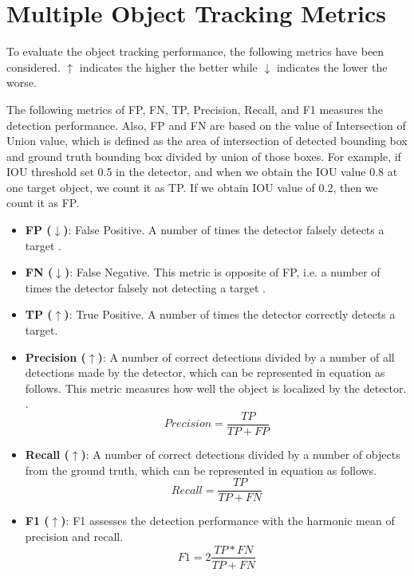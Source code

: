 \section{Multiple Object Tracking Metrics}
\label{sec:background/section_d}

To evaluate the object tracking performance, the following metrics have been considered. $\uparrow$ indicates the higher the better while $\downarrow$ indicates the lower the worse.

The following metrics of FP, FN, TP, Precision, Recall, and F1 measures the detection performance. Also, FP and FN are based on the value of Intersection of Union value, which is defined as the area of intersection of detected bounding box and ground truth bounding box divided by union of those boxes. For example, if IOU threshold set 0.5 in the detector, and when we obtain the IOU value 0.8 at one target object, we count it as TP. If we obtain IOU value of 0.2, then we count it as FP.

\begin{itemize}


\item \textbf{FP ($\downarrow$)}: False Positive. A number of times the detector falsely detects a target \cite{ristani_performance_2016}.

\item \textbf{FN ($\downarrow$)}: False Negative. This metric is opposite of FP, i.e. a number of times the detector falsely not detecting a target \cite{ristani_performance_2016}.

\item \textbf{TP ($\uparrow$)}: True Positive. A number of times the detector correctly detects a target. 

\item \textbf{Precision ($\uparrow$)}: A number of correct detections divided by a number of all detections made by the detector, which can be represented in equation as follows. This metric measures how well the object is localized by the detector. \cite{ristani_performance_2016} \cite{milan_mot16_2016}.
\begin{equation}
Precision = \frac{TP}{TP + FP}
\end{equation}

\item \textbf{Recall ($\uparrow$)}: A number of correct detections divided by a number of objects from the ground truth, which can be represented in equation as follows.
\begin{equation}
Recall = \frac{TP}{TP + FN}
\end{equation}

\item \textbf{F1 ($\uparrow$)}: F1 assesses the detection performance with the harmonic mean of precision and recall.
\begin{equation}
F1 = 2\frac{TP * FN}{TP + FN}
\end{equation}
\end{itemize}

